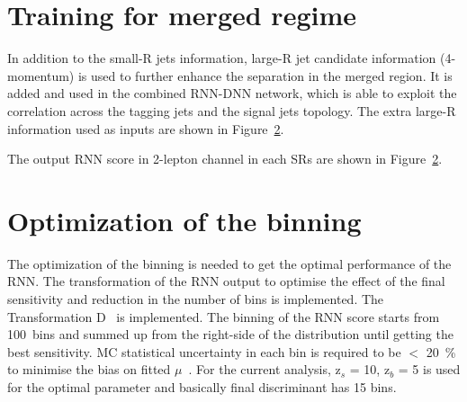 \section{Training for merged regime}
In addition to the small-R jets information, large-R jet candidate information (4-momentum) is used to further enhance the separation in the merged region. It is added and used in the combined RNN-DNN network, which is able to exploit the correlation across the tagging jets and the signal jets topology.
The extra large-R information used as inputs are shown in Figure~\ref{}.

The output RNN score in 2-lepton channel in each SRs are shown in Figure~\ref{}.

\section{Optimization of the binning}
The optimization of the binning is needed to get the optimal performance of the RNN. The transformation of the RNN output to optimise the effect of the final sensitivity and reduction in the number of bins is implemented.
The Transformation D~\cite{ATL-PHYS-PUB-2019-009} is implemented.
The binning of the RNN score starts from 100~bins and summed up from the right-side of the distribution until getting the best sensitivity. 
MC statistical uncertainty in each bin is required to be $<$ 20~\% to minimise the bias on fitted $\mu$~\cite{ATL-PHYS-PUB-2019-009}.
For the current analysis, z$_s$ = 10, z$_b$ = 5 is used for the optimal parameter and basically final discriminant has 15 bins.  